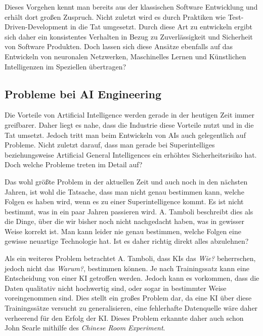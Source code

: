         Dieses Vorgehen kennt man bereits aus der klassischen Software Entwicklung und erhält dort großen Zuspruch.
        Nicht zuletzt wird es durch Praktiken wie Test-Driven-Development in die Tat umgesetzt. \cite[p. 403]{Kollanus2010}
        Durch diese Art zu entwickeln ergibt sich daher ein konsistentes Verhalten in Bezug zu Zuverlässigkeit und
        Sicherheit von Software Produkten. Doch lassen sich diese Ansätze ebenfalls auf das Entwickeln von
        neuronalen Netzwerken, Maschinelles Lernen und Künstlichen Intelligenzen im Speziellen übertragen?

        \subsection{Probleme bei AI Engineering}
        Die Vorteile von Artificial Intelligence werden gerade in der heutigen Zeit immer greifbarer. Daher liegt es
        nahe, dass die Industrie diese Vorteile nutzt und in die Tat umsetzt. Jedoch tritt man beim Entwickeln von AIs
        auch gelegentlich auf Probleme. Nicht zuletzt darauf, dass man gerade bei Superintelliges beziehungsweise
        Artificial General Intelligences ein erhöhtes Sicherheitsrisiko hat. Doch welche Probleme treten im Detail auf?

        Das wohl größte Problem in der aktuellen Zeit und auch noch in den nächsten Jahren, ist wohl die Tatsache, dass
        man nicht genau bestimmen kann, welche Folgen es haben wird, wenn es zu einer Superintelligence kommt.
        \cite[p. 21]{Tamboli2019} Es ist nicht bestimmt, was in ein paar Jahren passieren wird. A. Tamboli beschreibt
        dies als die Dinge, über die wir bisher noch nicht nachgedacht haben, was in gewisser Weise korrekt ist.
        Man kann leider nie genau bestimmen, welche Folgen eine gewisse neuartige Technologie hat. Ist es daher richtig
        direkt alles abzulehnen?

        Als ein weiteres Problem betrachtet A. Tamboli, dass KIs das \textit{Wie?} beherrschen, jedoch nicht das
        \textit{Warum?}, bestimmen können.\cite[p. 24]{Tamboli2019} Je nach Trainingssatz kann eine Entscheidung von
        einer KI getroffen werden. Jedoch kann es vorkommen, dass die Daten qualitativ nicht hochwertig sind, oder sogar
        in bestimmter Weise voreingenommen sind. Dies stellt ein großes Problem dar, da eine KI über diese Trainingssätze
        versucht zu generalisieren, eine fehlerhafte Datenquelle wäre daher verheerend für den Erfolg der KI. Dieses
        Problem erkannte daher auch schon John Searle mithilfe des \textit{Chinese Room Experiment}.\cite{cole_2014}

